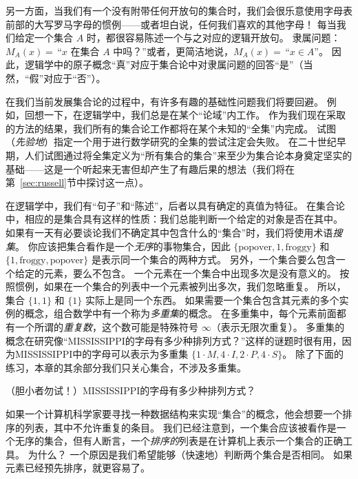 另一方面，当我们有一个没有附带任何开放句的集合时，我们会很乐意使用字母表前部的大写罗马字母的惯例——或者坦白说，任何我们喜欢的其他字母！
每当我们给定一个集合 $A$ 时，都很容易陈述一个与之对应的逻辑开放句。
隶属问题：$M_A(x) = \,$“$x$ 在集合 $A$ 中吗？”或者，更简洁地说，$M_A(x) = \,$“$x \in A$”。
因此，逻辑学中的原子概念“真”对应于集合论中对隶属问题的回答“是”（当然，“假”对应于“否”）。

在我们当前发展集合论的过程中，有许多有趣的基础性问题我们将要回避。
例如，回想一下，在逻辑学中，我们总是在某个“论域”内工作。
作为我们现在采取的方法的结果，我们所有的集合论工作都将在某个未知的“全集”内完成。
试图（\emph{先验地}）指定一个用于进行数学研究的全集的尝试注定会失败。
在二十世纪早期，人们试图通过将全集定义为“所有集合的集合”来至少为集合论本身奠定坚实的基础——这是一个听起来无害但却产生了有趣后果的想法（我们将在第~\ref{sec:russell}节中探讨这一点）。

在逻辑学中，我们有“句子”和“陈述”，后者以具有确定的真值为特征。
在集合论中，相应的是集合具有这样的性质：我们总能判断一个给定的对象是否在其中。
如果有一天有必要谈论我们不确定其中包含什么的“集合”时，我们将使用术语\emph{搜集}。
你应该把集合看作是一个\emph{无序}的事物集合，因此 $\{ \mbox{popover}, 1, \mbox{froggy} \}$ 和 $\{ 1, \mbox{froggy}, \mbox{popover} \}$ 是表示同一个集合的两种方式。
另外，一个集合要么包含一个给定的元素，要么不包含。
一个元素在一个集合中出现多次是没有意义的。
按照惯例，如果在一个集合的列表中一个元素被列出多次，我们忽略重复。
所以，集合 $\{ 1, 1\}$ 和 $\{1\}$ 实际上是同一个东西。
如果需要一个集合包含其元素的多个实例的概念，组合数学中有一个称为\emph{多重集}的概念。
在多重集中，每个元素前面都有一个所谓的\emph{重复数}，这个数可能是特殊符号 $\infty$（表示无限次重复）。
多重集的概念在研究像“MISSISSIPPI的字母有多少种排列方式？”这样的谜题时很有用，因为MISSISSIPPI中的字母可以表示为多重集 $\{1\cdot M, 4\cdot I, 2\cdot P, 4\cdot S \}$。
除了下面的练习，本章的其余部分我们只关心集合，不涉及多重集。

\begin{exer}
（胆小者勿试！）MISSISSIPPI的字母有多少种排列方式？
\end{exer}

如果一个计算机科学家要寻找一种数据结构来实现“集合”的概念，他会想要一个排序的列表，其中不允许重复的条目。
我们已经注意到，一个集合应该被看作是一个无序的集合，但有人断言，一个\emph{排序的}列表是在计算机上表示一个集合的正确工具。
为什么？
一个原因是我们希望能够（快速地）判断两个集合是否相同。
如果元素已经预先排序，就更容易了。

